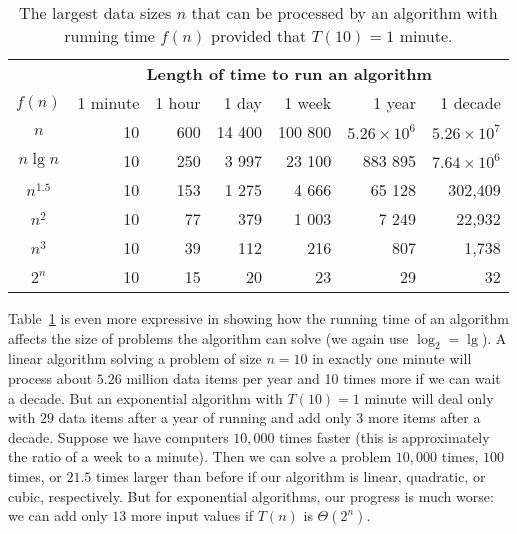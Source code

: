\begin{table}[htbp] 
\caption[The largest data sizes $n$ that can be
processed by an algorithm.]%
{\label{t:data-size} The largest data sizes $n$ that can be
processed by an algorithm with running time $f(n)$
provided that $T(10)= 1$ minute.} 
\begin{center}
   \begin{tabular}{|c|r|r|r|r|r|r|} \hline
      & \multicolumn{6}{|c|}{\textbf{Length of time to run an algorithm}}\\
                \cline{2-7}
$f(n)$  & 1 minute & 1 hour & 1 day & 1 week & 1 year & 1 decade  \\
\hline
  $n$         & 10  & 600 & 14 400 & 100 800 & $5.26\times 10^{6}$  &
$5.26\times  10^{7}$  \\ \hline 
  $n\lg n$    & 10  & 250 & 3 997 & 23 100  & 883 895   & $7.64\times 10^6$
  \\ \hline 
  $n^{1.5}$    & 10  & 153 &  1 275 &   4 666 &    65 128 &
   302,409   \\ \hline 
  $n^{2}$      & 10  &  77 &    379 &   1 003 &     7 249 &
    22,932   \\ \hline 
  $n^{3}$      & 10  &  39 &    112 &     216 &       807 &
     1,738  \\ \hline 
  $2^{n}$      & 10  &  15 &     20 &      23 &        29 &
        32   \\ \hline
   \end{tabular}
   \end{center} 
 \end{table} 
 
Table~\ref{t:data-size} is even more expressive in showing
how the running time of an algorithm affects the size of problems the
algorithm can solve (we again use $\log_{2} = \lg$). A linear algorithm solving 
a problem of size $n=10$ in exactly one minute will process about $5.26$ million  
data items per year and 10 times more if we can wait a decade. 
But an exponential algorithm  with \(T(10)=1\) minute will deal
only with $29$ data items after a year of running and add only $3$
more items after a decade.  Suppose we have computers $10,000$ times
faster (this is approximately the ratio of a week to a minute). Then 
we can solve a problem $10,000$ times, $100$ times, or $21.5$ times 
larger than before if our algorithm is linear, quadratic, or cubic, 
respectively. But for exponential algorithms, our progress is much worse: 
we can add only $13$ more input values if $T(n)$ is $\Theta(2^n)$.

